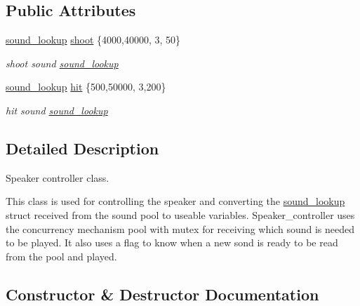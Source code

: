 \subsection*{Public Attributes}
\begin{DoxyCompactItemize}
\item 
\hypertarget{classspeaker__controller_a35a3ec318694a96a19fa242fa061205b}{}\label{classspeaker__controller_a35a3ec318694a96a19fa242fa061205b} 
\hyperlink{structsound__lookup}{sound\+\_\+lookup} \hyperlink{classspeaker__controller_a35a3ec318694a96a19fa242fa061205b}{shoot} \{4000,40000, 3, 50\}
\begin{DoxyCompactList}\small\item\em shoot sound \hyperlink{structsound__lookup}{sound\+\_\+lookup} \end{DoxyCompactList}\item 
\hypertarget{classspeaker__controller_a188de8c71de428765cd73f0f66d6d44e}{}\label{classspeaker__controller_a188de8c71de428765cd73f0f66d6d44e} 
\hyperlink{structsound__lookup}{sound\+\_\+lookup} \hyperlink{classspeaker__controller_a188de8c71de428765cd73f0f66d6d44e}{hit} \{500,50000, 3,200\}
\begin{DoxyCompactList}\small\item\em hit sound \hyperlink{structsound__lookup}{sound\+\_\+lookup} \end{DoxyCompactList}\end{DoxyCompactItemize}


\subsection{Detailed Description}
Speaker controller class. 

This class is used for controlling the speaker and converting the \hyperlink{structsound__lookup}{sound\+\_\+lookup} struct received from the sound pool to useable variables. Speaker\+\_\+controller uses the concurrency mechanism pool with mutex for receiving which sound is needed to be played. It also uses a flag to know when a new sond is ready to be read from the pool and played. 

\subsection{Constructor \& Destructor Documentation}
\hypertarget{classspeaker__controller_aff5f11eb09fef5a599181d36a6b2a2a9}{}\label{classspeaker__controller_aff5f11eb09fef5a599181d36a6b2a2a9} 
